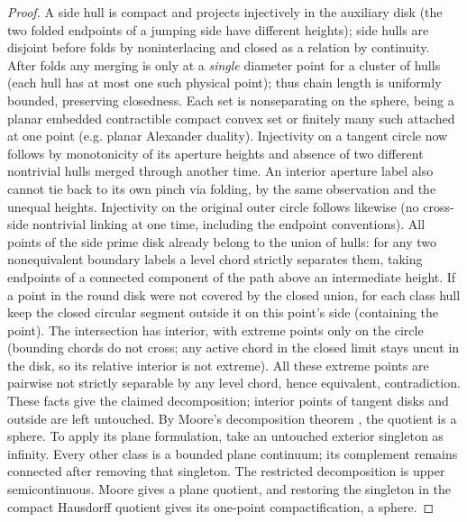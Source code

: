 \begin{proof}
A side hull is compact and projects injectively in the auxiliary disk (the two folded endpoints of a jumping side have different heights); side hulls are disjoint before folds by noninterlacing and closed as a relation by continuity.
After folds any merging is only at a \emph{single} diameter point for a cluster of hulls (each hull has at most one such physical point); thus chain length is uniformly bounded, preserving closedness.
Each set is nonseparating on the sphere, being a planar embedded contractible compact convex set or finitely many such attached at one point (e.g. planar Alexander duality).
Injectivity on a tangent circle now follows by monotonicity of its aperture heights and absence of two different nontrivial hulls merged through another time.
An interior aperture label also cannot tie back to its own pinch via folding, by the same observation and the unequal heights.
Injectivity on the original outer circle follows likewise (no cross-side nontrivial linking at one time, including the endpoint conventions).
All points of the side prime disk already belong to the union of hulls: for any two nonequivalent boundary labels a level chord strictly separates them, taking endpoints of a connected component of the path above an intermediate height.
If a point in the round disk were not covered by the closed union, for each class hull keep the closed circular segment outside it on this point's side (containing the point).
The intersection has interior, with extreme points only on the circle (bounding chords do not cross; any active chord in the closed limit stays uncut in the disk, so its relative interior is not extreme).
All these extreme points are pairwise not strictly separable by any level chord, hence equivalent, contradiction.
These facts give the claimed decomposition; interior points of tangent disks and outside are left untouched.
By Moore's decomposition theorem \citep[Theorem~22, p.~425]{MooreDecomposition},
the quotient is a sphere.  To apply its plane formulation, take an untouched
exterior singleton as infinity.  Every other class is a bounded plane
continuum; its complement remains connected after removing that singleton.
The restricted decomposition is upper semicontinuous.  Moore gives a plane
quotient, and restoring the singleton in the compact Hausdorff quotient gives
its one-point compactification, a sphere.



\end{proof}
